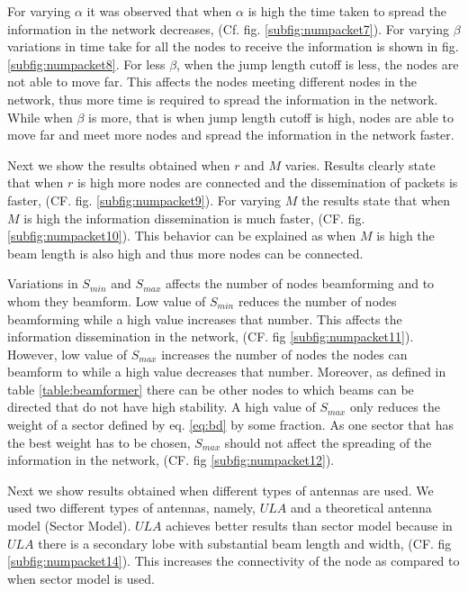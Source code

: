 \documentclass[preprint, twocolumn,5p]{elsarticle}
\begin{document}
    For varying $\alpha$ it was observed that when $\alpha$ is high the time taken to spread the information in the network decreases, (Cf. fig. \ref{subfig:numpacket7}). For varying $\beta$ variations in time take for all the nodes to receive the information is shown in fig. \ref{subfig:numpacket8}. For less $\beta$, when the jump length cutoff is less, the nodes are not able to move far. This affects the nodes meeting different nodes in the network, thus more time is required to spread the information in the network. While when $\beta$ is more, that is when jump length cutoff is high, nodes are able to move far and meet more nodes and spread the information in the network faster.

    Next we show the results obtained when $r$ and $M$ varies. Results clearly state that when $r$ is high more nodes are connected and the dissemination of packets is faster, (CF. fig. \ref{subfig:numpacket9}). For varying $M$ the results state that when $M$ is high the information dissemination is much faster, (CF. fig. \ref{subfig:numpacket10}). This behavior can be explained as when $M$ is high the beam length is also high and thus more nodes can be connected.

    Variations in $S_{min}$ and $S_{max}$ affects the number of nodes beamforming and to whom they beamform. Low value of $S_{min}$ reduces the number of nodes beamforming while a high value increases that number. This affects the information dissemination in the network, (CF. fig \ref{subfig:numpacket11}). However, low value of $S_{max}$ increases the number of nodes the nodes can beamform to while a high value decreases that number. Moreover, as defined in table \ref{table:beamformer} there can be other nodes to which beams can be directed that do not have high stability. A high value of $S_{max}$ only reduces the weight of a sector defined by eq. \ref{eq:bd} by some fraction.  As one sector that has the best weight has to be chosen, $S_{max}$ should not affect the spreading of the information in the network, (CF. fig \ref{subfig:numpacket12}).

    Next we show results obtained when different types of antennas are used. We used two different types of antennas, namely, $ULA$ and a theoretical antenna model (Sector Model). $ULA$ achieves better results than sector model because in $ULA$ there is a secondary lobe with substantial beam length and width, (CF. fig \ref{subfig:numpacket14}). This increases the connectivity of the node as compared to when sector model is used.
\end{document}
